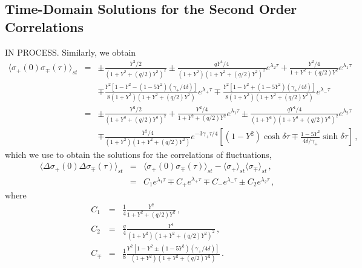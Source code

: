 \documentclass[twocolumn,aps,eqsecnum,showkeys,amsmath]{revtex4-2}
\begin{document}
\begin{widetext}
\subsection{Time-Domain Solutions for the Second Order Correlations} 
IN PROCESS. Similarly, we obtain 
%
\begin{eqnarray} 	\label{eq:p_tauApp}
\langle \sigma_+(0)  \sigma_{\mp}(\tau) \rangle_{st} 
&=& \pm \frac{ Y^2/2 }{ (1+Y^2 +(q/2)Y^2)^2 }
	\pm  \frac{qY^4/4}{(1+Y^2) \left( 1+Y^2 +(q/2)Y^2 \right)^2} 
		e^{\lambda_2 \tau} 
	+\frac{Y^2/4}{ 1+Y^2 +(q/2)Y^2 } e^{\lambda_1 \tau}   \nonumber \\ 
&& \mp \frac{Y^2 [1-Y^2 -(1-5Y^2)(\gamma_+/4\delta)] }
	{8(1+Y^2) \left( 1+Y^2 +(q/2)Y^2 \right)} e^{\lambda_+ \tau} 
	 \mp \frac{Y^2 [1-Y^2 +(1-5Y^2)(\gamma_+/4\delta)] }
	{8(1+Y^2) \left( 1+Y^2 +(q/2)Y^2 \right)} e^{\lambda_- \tau} \nonumber \\
&=& \pm \frac{ Y^2/2 }{ (1+Y^2 +(q/2)Y^2)^2 }
	+\frac{Y^2/4}{ 1+Y^2 +(q/2)Y^2 } e^{\lambda_1 \tau} 
	\pm \frac{qY^4/4}{(1+Y^2) \left( 1+Y^2 +(q/2)Y^2 \right)^2} 
		e^{\lambda_2 \tau} 	\nonumber \\ 
&& \mp \frac{Y^2/4 }{(1+Y^2) \left( 1+Y^2 +(q/2)Y^2 \right)} 
	e^{-3\gamma_+ \tau /4} \left[ (1-Y^2) \cosh{\delta \tau} 
	 \mp \frac{1-5Y^2}{4\delta/\gamma_+} \sinh{\delta \tau}  	\right] 	\,, 
\end{eqnarray}
which we use to obtain the solutions for the correlations of fluctuations, 
%
\begin{eqnarray} 		
\langle \Delta \sigma_+(0) \Delta \sigma_{\mp}(\tau) \rangle_{st} 
	&=& \langle \sigma_+(0) \sigma_{\mp}(\tau) \rangle_{st}  
	-\langle \sigma_+ \rangle_{st}  \langle \sigma_{\mp} \rangle_{st} \,, 
	\nonumber 		\label{eq:corr2split}	\\ 
&=& C_1 e^{\lambda_1 \tau} \mp C_+ e^{\lambda_+ \tau}     
	\mp C_- e^{\lambda_- \tau}  \pm  C_2 e^{\lambda_2 \tau} 	\,, 
	\label{eq:p_tau}	
\end{eqnarray}
where 
%
\begin{subequations} 	\label{eq:p-coef}
\begin{eqnarray} 		
C_1  &=& \frac{1}{4} \frac{Y^2}{ 1+Y^2 +(q/2)Y^2 } 	\,, \\ 
C_2 &=&  \frac{q}{4} \frac{Y^4}{ (1+Y^2) \left( 1+Y^2 +(q/2)Y^2 \right)^2}	\,,  
	\label{eq:C2} \\ 
C_{\mp} &=&   \frac{1}{8} \frac{ Y^2[1-Y^2 \pm (1-5Y^2)(\gamma_+/4\delta)] }
	{ (1+Y^2) \left( 1+Y^2 +(q/2)Y^2 \right)} 	  \,.
\end{eqnarray} 
\end{subequations} 



\end{widetext}
\end{document}
